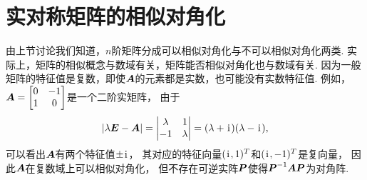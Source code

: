 \section{实对称矩阵的相似对角化}
由上节讨论我们知道，\(n\)阶矩阵分成可以相似对角化与不可以相似对角化两类.
实际上，矩阵的相似概念与数域有关，矩阵能否相似对角化也与数域有关.
因为一般矩阵的特征值是复数，即使\(\boldsymbol{A}\)的元素都是实数，也可能没有实数特征值.
例如，\(\boldsymbol{A} = \begin{bmatrix} 0 & -1 \\ 1 & 0 \end{bmatrix}\)是一个二阶实矩阵，
由于\begin{equation*}
	\abs{\lambda\boldsymbol{E}-\boldsymbol{A}}
	= \begin{vmatrix}
		\lambda & 1 \\
		-1 & \lambda
	\end{vmatrix}
	= (\lambda+\kern1pt\mathrm{i}\kern1pt)(\lambda-\kern1pt\mathrm{i}\kern1pt),
\end{equation*}
可以看出\(\boldsymbol{A}\)有两个特征值\(\pm\kern1pt\mathrm{i}\kern1pt\)，
其对应的特征向量\((\kern1pt\mathrm{i}\kern1pt,1)^T\)和\((\kern1pt\mathrm{i}\kern1pt,-1)^T\)是复向量，
因此\(\boldsymbol{A}\)在复数域上可以相似对角化，
但不存在可逆实阵\(\boldsymbol{P}\)使得\(\boldsymbol{P}^{-1}\boldsymbol{A}\boldsymbol{P}\)为对角阵.

